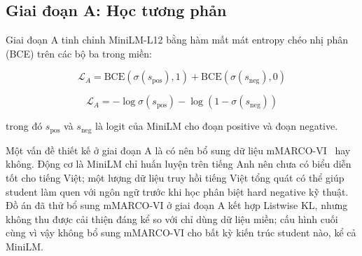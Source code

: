 \documentclass[../DoAn.tex]{subfiles}
\begin{document}
\begin{table}[H]
    \centering
    \caption{Tổng quan tập dữ liệu huấn luyện reranker}
    \label{tab:reranker-training-data}
    {\small
    \setlength{\tabcolsep}{5pt}
    }
\end{table}

\subsection{Giai đoạn A: Học tương phản}
\label{subsection:3.8.3}

Giai đoạn A tinh chỉnh MiniLM-L12 bằng hàm mất mát entropy chéo nhị phân (BCE) trên các bộ ba trong miền:

\[
\mathcal{L}_A
=
\text{BCE}(\sigma(s_{\text{pos}}),1)
+
\text{BCE}(\sigma(s_{\text{neg}}),0)
\]

\[
\mathcal{L}_A
=
-\log\sigma(s_{\text{pos}})
-
\log\left(1-\sigma(s_{\text{neg}})\right)
\]

trong đó $s_{\text{pos}}$ và $s_{\text{neg}}$ là logit của MiniLM cho đoạn positive và đoạn negative.

Một vấn đề thiết kế ở giai đoạn A là có nên bổ sung dữ liệu mMARCO-VI~\cite{bonifacio2021mmarco} hay không. Động cơ là MiniLM chỉ huấn luyện trên tiếng Anh nên chưa có biểu diễn tốt cho tiếng Việt; một lượng dữ liệu truy hồi tiếng Việt tổng quát có thể giúp student làm quen với ngôn ngữ trước khi học phân biệt hard negative kỹ thuật. Đồ án đã thử bổ sung mMARCO-VI ở giai đoạn A kết hợp Listwise KL, nhưng không thu được cải thiện đáng kể so với chỉ dùng dữ liệu miền; cấu hình cuối cùng vì vậy không bổ sung mMARCO-VI cho bất kỳ kiến trúc student nào, kể cả MiniLM.
\end{document}
